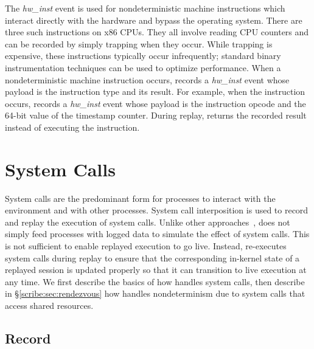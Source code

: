 The {\em hw\_inst} event is used for nondeterministic machine
instructions which interact directly with the hardware and bypass the
operating system.  There are three such instructions on x86 CPUs.
They all involve reading CPU counters and can be recorded by simply
trapping when they occur.  While trapping is expensive, these
instructions typically occur infrequently; standard binary
instrumentation techniques can be used to optimize performance. 
When a nondeterministic machine instruction occurs, \scribe{} records
a {\em hw\_inst} event whose payload is the instruction type and
its result.  For example, when the  instruction occurs,
\scribe{} records a {\em hw\_inst} event whose payload is the
 instruction opcode and the 64-bit value of the timestamp
counter.  During replay, \scribe{} returns the recorded result
instead of executing the instruction.

\section{System Calls}
\label{scribe:sec:syscalls}

System calls are the predominant form for processes to interact with
the environment and with other processes. System call interposition is
used to record and replay the execution of system calls.
Unlike other approaches~\cite{liblog,jockey,srinivasan:flashback}, \scribe{} does
not simply feed processes with logged data to simulate the effect of
system calls.  This is not sufficient to enable replayed execution to
go live.  Instead, \scribe{} re-executes system calls during replay to
ensure that the corresponding in-kernel state of a replayed session is
updated properly so that it can transition to live execution at any
time.  We first describe the basics of how \scribe{} handles system
calls, then describe in \S\ref{scribe:sec:rendezvous} how \scribe{}
handles nondeterminism due to system calls that access shared
resources. 

  

\subsection{Record}

